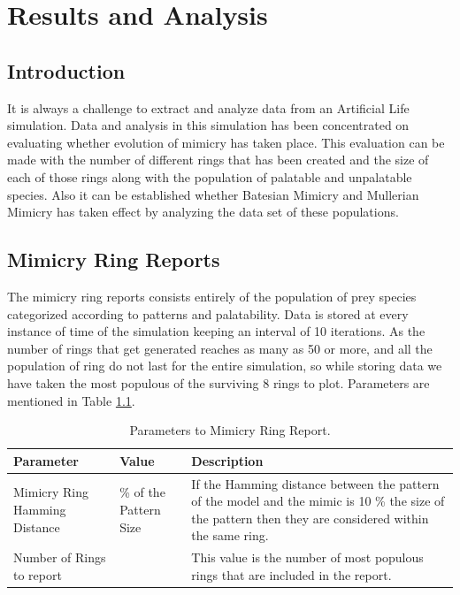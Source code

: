 \chapter{Results and Analysis}

\section{Introduction}
It is always a challenge to extract and analyze data from an Artificial Life simulation. Data and analysis in this simulation has been concentrated on evaluating whether evolution of mimicry has taken place. This evaluation can be made with the number of different rings that has been created and the size of each of those rings along with the population of palatable and unpalatable species. Also it can be established whether Batesian Mimicry and Mullerian Mimicry has taken effect by analyzing the data set of these populations.

\section{Mimicry Ring Reports}
The mimicry ring reports consists entirely of the population of prey species categorized according to patterns and palatability. Data is stored at every instance of time of the simulation keeping an interval of 10 iterations. As the number of rings that get generated reaches as many as 50 or more, and all the population of ring do not last for the entire simulation, so while storing data we have taken the most populous of the surviving 8 rings to plot. Parameters are mentioned in Table \ref{tab:ring-report-control-parameters}.

\begin{table}[H]
\centering
\begin{tabular}{| p{2cm} | >{\centering} p{2.2cm} | p{8cm} |}
	\hline
		\textbf{Parameter} & \textbf{Value} & \textbf{Description} \\ \hline
		Mimicry Ring Hamming Distance & 10 \% of the Pattern Size & If the Hamming distance between the pattern of the model and the mimic is 10 \% the size of the pattern then they are considered within the same ring.\\ \hline
		Number of Rings to report & 8 & This value is the number of most populous rings that are included in the report.\\
	\hline
\end{tabular}
\caption{Parameters to Mimicry Ring Report.}
\label{tab:ring-report-control-parameters}
\end{table}

